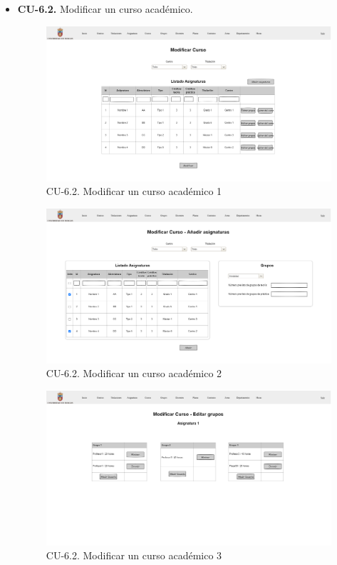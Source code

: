 \begin{itemize}
	\item \textbf{CU-6.2.} Modificar un curso académico.
	\begin{figure}[!h]
		\centering
		\includegraphics[width=\textwidth]{../img/Anexos/Vistas/mod_curso_1.png}
		\caption{CU-6.2. Modificar un curso académico 1}\label{fig:../img/Anexos/Vistas/mod_curso_1.png}
	\end{figure}
		
	\begin{figure}[!h]
		\centering
		\includegraphics[width=\textwidth]{../img/Anexos/Vistas/mod_curso_2.png}
		\caption{CU-6.2. Modificar un curso académico 2}\label{fig:../img/Anexos/Vistas/mod_curso_2.png}
	\end{figure}
	
	\begin{figure}[!h]
		\centering
		\includegraphics[width=\textwidth]{../img/Anexos/Vistas/mod_curso_3.png}
		\caption{CU-6.2. Modificar un curso académico 3}\label{fig:../img/Anexos/Vistas/mod_curso_3.png}
	\end{figure}


\end{itemize}
